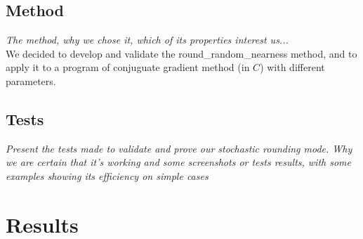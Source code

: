 \documentclass[a4paper,11pt]{article}
\begin{document}
\subsection{Method}
\emph{The method, why we chose it, which of its properties interest us...}
\\We decided to develop and validate the {\ttfamily round\_random\_nearness} method, and to apply it to a program of conjuguate gradient method (in $C$) with different parameters. %
\subsection{Tests}
\emph{Present the tests made to validate and prove our stochastic rounding mode. Why we are certain that it's working and some screenshots or tests results, with some examples showing its efficiency on simple cases}

\section{Results}
\end{document}
